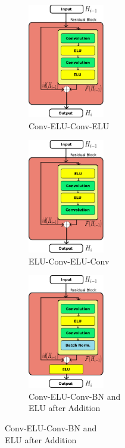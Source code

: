 \documentclass[10pt,twocolumn,letterpaper]{article}
\begin{document}

\begin{figure}
    \centering
    \begin{subfigure}{.24\linewidth}
        \centering
        \includegraphics[height=5cm]{ELUBlock1}
        \caption{Conv-ELU-Conv-ELU}
        \label{fig:Conv-ELU-Conv-ELU}
    \end{subfigure}
    \begin{subfigure}{.24\linewidth}
        \centering
        \includegraphics[height=5cm]{ELUBlock2}
        \caption{ELU-Conv-ELU-Conv}
        \label{fig:ELU-Conv-ELU-Conv}
    \end{subfigure}
    \begin{subfigure}{.24\linewidth}
        \centering
        \includegraphics[height=5cm]{ELUBlock3}
        \caption{Conv-ELU-Conv-BN and \\ ELU after Addition}
        \label{fig:Conv-ELU-Conv-BN1}
    \end{subfigure}

\end{figure}
\end{document}
